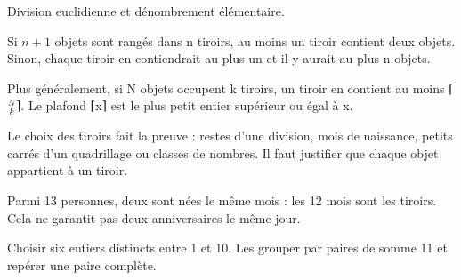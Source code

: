 \documentclass[11pt]{article}
\begin{document}
Division euclidienne et dénombrement élémentaire.\par
{}
Si \(n + 1\) objets sont rangés dans n tiroirs, au moins un tiroir contient deux objets. Sinon, chaque tiroir en contiendrait au plus un et il y aurait au plus n objets.\par
Plus généralement, si N objets occupent k tiroirs, un tiroir en contient au moins ⌈\(\frac{N}{k}\)⌉. Le plafond ⌈x⌉ est le plus petit entier supérieur ou égal à x.\par
Le choix des tiroirs fait la preuve : restes d’une division, mois de naissance, petits carrés d’un quadrillage ou classes de nombres. Il faut justifier que chaque objet appartient à un tiroir.\par
{}
Parmi 13 personnes, deux sont nées le même mois : les 12 mois sont les tiroirs. Cela ne garantit pas deux anniversaires le même jour.\par
{}
Choisir six entiers distincts entre 1 et 10. Les grouper par paires de somme 11 et repérer une paire complète.\par
\end{document}
